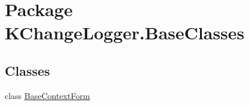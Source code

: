 \hypertarget{namespace_k_change_logger_1_1_base_classes}{\section{Package K\-Change\-Logger.\-Base\-Classes}
\label{namespace_k_change_logger_1_1_base_classes}
}
\subsection*{Classes}
\begin{DoxyCompactItemize}
\item 
class \hyperlink{class_k_change_logger_1_1_base_classes_1_1_base_context_form}{Base\-Context\-Form}
\end{DoxyCompactItemize}
